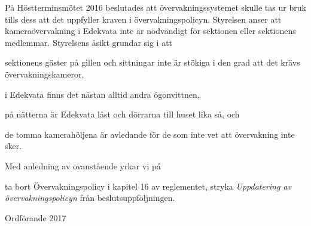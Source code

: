 \documentclass[../_main/handlingar.tex]{subfiles}
\begin{document}
På Höstterminsmötet 2016 beslutades att övervakningssystemet skulle tas ur bruk tills dess att det uppfyller kraven i övervakningspolicyn. Styrelsen anser att kameraövervakning i Edekvata inte är nödvändigt för sektionen eller sektionens medlemmar. Styrelsens åsikt grundar sig i att
\begin{dashlist}
\item sektionens gäster på gillen och sittningar inte är stökiga i den grad att det krävs övervakningskameror,
\item i Edekvata finns det nästan alltid andra ögonvittnen,
\item på nätterna är Edekvata låst och dörrarna till huset lika så, och
\item de tomma kamerahöljena är avledande för de som inte vet att övervakning inte sker.
\end{dashlist}

Med anledning av ovanstående yrkar vi på

\begin{attsatser}
    \att ta bort Övervakningspolicy i kapitel 16 av reglementet,
    \att stryka \emph{Uppdatering av övervakningspolicyn} från beslutsuppföljningen.
\end{attsatser}

\begin{signatures}{1}
    \ist
    \signature{Erik Månsson}{Ordförande 2017}
\end{signatures}
\end{document}
